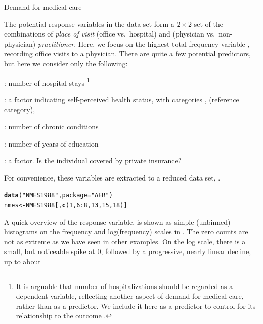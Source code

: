 \documentclass[11pt]{book}\usepackage[]{graphicx}\usepackage[]{color}
\makeatletter
\newcommand{\hlnum}[1]{\textcolor[rgb]{0.686,0.059,0.569}{#1}}%
\newcommand{\hlstr}[1]{\textcolor[rgb]{0.192,0.494,0.8}{#1}}%
\newcommand{\hlopt}[1]{\textcolor[rgb]{0,0,0}{#1}}%
\newcommand{\hlstd}[1]{\textcolor[rgb]{0.345,0.345,0.345}{#1}}%
\newcommand{\hlkwb}[1]{\textcolor[rgb]{0.69,0.353,0.396}{#1}}%
\newcommand{\hlkwc}[1]{\textcolor[rgb]{0.333,0.667,0.333}{#1}}%
\newcommand{\hlkwd}[1]{\textcolor[rgb]{0.737,0.353,0.396}{\textbf{#1}}}%
\newenvironment{kframe}{%
 \def\at@end@of@kframe{}%
 \ifinner\ifhmode%
  \def\at@end@of@kframe{\end{minipage}}%
  \begin{minipage}{\columnwidth}%
 \fi\fi%
 \def\FrameCommand##1{\hskip\@totalleftmargin \hskip-\fboxsep
 \colorbox{shadecolor}{##1}\hskip-\fboxsep
     \hskip-\linewidth \hskip-\@totalleftmargin \hskip\columnwidth}%
 \MakeFramed {\advance\hsize-\width
   \@totalleftmargin\z@ \linewidth\hsize
   \@setminipage}}%
 {\par\unskip\endMakeFramed%
 \at@end@of@kframe}
\newenvironment{knitrout}{}{} %
\renewenvironment{knitrout}{\small\renewcommand{\baselinestretch}{.85}}{} %
\makeatother
\begin{document}
\begin{Example}[nmes1]{Demand for medical care}

The potential response variables in the  data set
form a $2 \times 2$ set of the combinations
of \emph{place of visit} (office vs.\ hospital) and (physician vs.\ non-physician) \emph{practitioner}.
Here, we focus on the highest total frequency
variable , recording office visits to a physician.
There are quite a few potential predictors, but here we consider only
the following: 
\begin{itemize*}
\item {}: number of hospital stays%
\footnote{
It is arguable that number of hospitalizations should be regarded as a
dependent variable, reflecting another aspect of demand for medical care,
rather than as a predictor.  We include it here as a predictor to control
for its relationship to the outcome .
}
\item {}: a factor indicating self-perceived health status, with categories
  ,  (reference category),  
\item {}:  number of chronic conditions
\item {} 
\item {}:  number of years of education
\item {}: a factor. Is the individual covered by private insurance?
\end{itemize*}
For convenience, these variables are extracted to a reduced data set, .
\begin{knitrout}
\color{fgcolor}\begin{kframe}
\begin{alltt}
\hlkwd{data}\hlstd{(}\hlstr{"NMES1988"}\hlstd{,} \hlkwc{package}\hlstd{=}\hlstr{"AER"}\hlstd{)}
\hlstd{nmes} \hlkwb{<-} \hlstd{NMES1988[,} \hlkwd{c}\hlstd{(}\hlnum{1}\hlstd{,} \hlnum{6}\hlopt{:}\hlnum{8}\hlstd{,} \hlnum{13}\hlstd{,} \hlnum{15}\hlstd{,} \hlnum{18}\hlstd{)]}
\end{alltt}
\end{kframe}
\end{knitrout}
A quick overview of the response variable,  is shown as simple (unbinned) histograms
on the frequency and log(frequency) scales in .
The zero counts are not as extreme as we have seen in other examples. On the log scale, there
is a small, but noticeable spike at 0, followed by a progressive, nearly linear decline, up to about

\end{Example}
\end{document}

